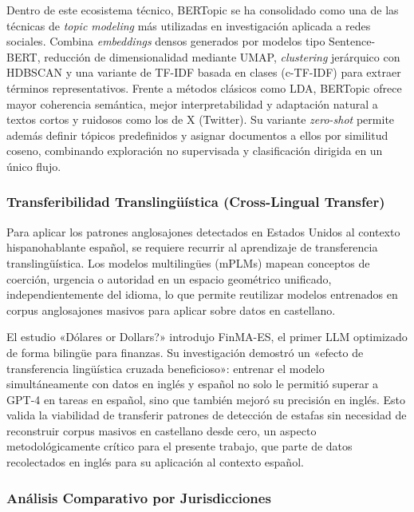 Dentro de este ecosistema técnico, BERTopic \citep{Grootendorst22} se ha consolidado como una de las técnicas de \textit{topic modeling} más utilizadas en investigación aplicada a redes sociales. Combina \textit{embeddings} densos generados por modelos tipo Sentence-BERT, reducción de dimensionalidad mediante UMAP, \textit{clustering} jerárquico con HDBSCAN y una variante de TF-IDF basada en clases (c-TF-IDF) para extraer términos representativos. Frente a métodos clásicos como LDA, BERTopic ofrece mayor coherencia semántica, mejor interpretabilidad y adaptación natural a textos cortos y ruidosos como los de X (Twitter). Su variante \textit{zero-shot} permite además definir tópicos predefinidos y asignar documentos a ellos por similitud coseno, combinando exploración no supervisada y clasificación dirigida en un único flujo.

\subsubsection{Transferibilidad Translingüística (Cross-Lingual Transfer)}

Para aplicar los patrones anglosajones detectados en Estados Unidos al contexto hispanohablante español, se requiere recurrir al aprendizaje de transferencia translingüística. Los modelos multilingües (mPLMs) mapean conceptos de coerción, urgencia o autoridad en un espacio geométrico unificado, independientemente del idioma, lo que permite reutilizar modelos entrenados en corpus anglosajones masivos para aplicar sobre datos en castellano.

El estudio «Dólares or Dollars?» \citep{Zhang24} introdujo FinMA-ES, el primer LLM optimizado de forma bilingüe para finanzas. Su investigación demostró un «efecto de transferencia lingüística cruzada beneficioso»: entrenar el modelo simultáneamente con datos en inglés y español no solo le permitió superar a GPT-4 en tareas en español, sino que también mejoró su precisión en inglés. Esto valida la viabilidad de transferir patrones de detección de estafas sin necesidad de reconstruir corpus masivos en castellano desde cero, un aspecto metodológicamente crítico para el presente trabajo, que parte de datos recolectados en inglés para su aplicación al contexto español.

\subsubsection{Análisis Comparativo por Jurisdicciones}

